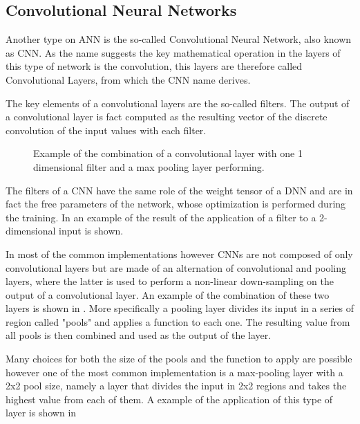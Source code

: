 \subsection{Convolutional Neural Networks}\label{cnn}

Another type on ANN is the so-called Convolutional Neural Network, also known as CNN. As the name suggests the key mathematical operation in the layers of this type of network is the convolution, this layers are therefore called Convolutional Layers, from which the CNN name derives.

The key elements of a convolutional layers are the so-called filters. The output of a convolutional layer is fact computed as the resulting vector of the discrete convolution of the input values with each filter. 

\begin{figure}
    \centering
  
    \caption{Example of the combination of a convolutional layer with one 1 dimensional filter and a max pooling layer performing.  }
    \label{fig:cnn_tot}
    \vspace{-1cm}
\end{figure}
The filters of a CNN have the same role of the weight tensor of a DNN and are in fact the free parameters of the network, whose optimization is performed during the training. In  an example of the result of the application of a filter to a 2-dimensional input is shown.

In most of the common implementations however CNNs are not composed of only convolutional layers but are made of an alternation of convolutional and pooling layers, where the latter is used to  perform a non-linear down-sampling on the output of a convolutional layer. An example of the combination of these two layers is shown in .
More specifically a pooling layer divides its input in a series of region called "pools" and applies a function to each one.
The resulting value from all pools is then combined and used as the output of the layer.


Many choices for both the size of the pools and the function to apply are possible however one of the most common implementation is a max-pooling layer with a 2x2 pool size, namely a layer that divides the input in 2x2 regions and takes the highest value from each of them. A example of the application of this type of layer is shown in  

